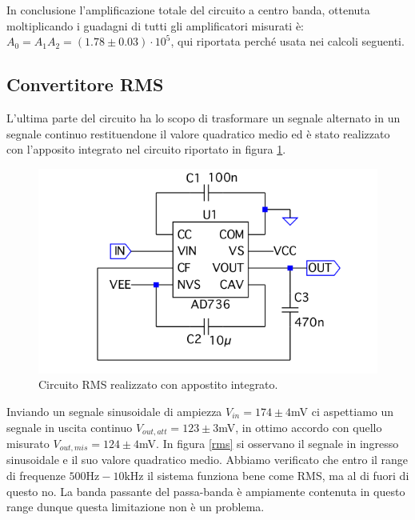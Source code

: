 \documentclass[10pt,a4paper]{article}
\begin{document}
In conclusione l'amplificazione totale del circuito a centro banda, ottenuta moltiplicando i guadagni di tutti gli amplificatori misurati è: $A_0 = A_1 A_2 = (1.78 \pm 0.03) \cdot 10^5$, qui riportata perché usata nei calcoli seguenti.

\subsection{Convertitore RMS}
L'ultima parte del circuito ha lo scopo di trasformare un segnale alternato in un segnale continuo restituendone il valore quadratico medio ed è stato realizzato con l'apposito integrato nel circuito riportato in figura \ref{rmsCircuito}.

\begin{figure}[!htb]
\centering
\includegraphics[scale=0.5]{rms.png}
\caption{Circuito RMS realizzato con appostito integrato.\label{rmsCircuito}}
\end{figure}

Inviando un segnale sinusoidale di ampiezza $V_{in} = 174 \pm 4$mV ci aspettiamo un segnale in uscita continuo $V_{out, att} = 123 \pm 3$mV, in ottimo accordo con quello misurato $V_{out, mis} = 124 \pm 4$mV. In  figura \ref{rms} si osservano il segnale in ingresso sinusoidale e il suo valore quadratico medio. Abbiamo verificato che entro il range di frequenze $500 \mbox{Hz} - 10 \mbox{kHz}$ il sistema funziona bene come RMS, ma al di fuori di questo no. La banda passante del passa-banda è ampiamente contenuta in questo range dunque questa limitazione non è un problema.
\end{document}
